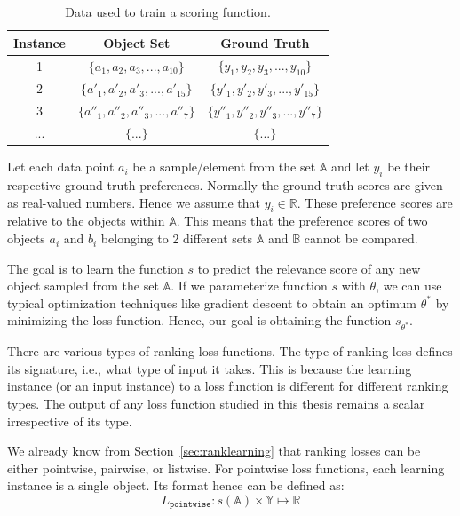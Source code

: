 \documentclass[12pt, twoside, ngerman]{report}
\begin{document}
\begin{table} [ht]
\centering
\begin{tabular}{ | c | c | c | }
  \toprule
  Instance & Object Set & Ground Truth \\ \midrule
  1 & $\{a_1, a_2, a_3, ... , a_{10}\}$  & $\{y_1, y_2, y_3, ... , y_{10}\}$  \\
  2 & $\{a'_1, a'_2, a'_3, ... , a'_{15}\}$ & $\{y'_1, y'_2, y'_3, ... , y'_{15}\}$  \\
  3 & $\{a''_1, a''_2, a''_3, ... , a''_{7}\}$ & $\{y''_1, y''_2, y''_3, ... , y''_{7}\}$  \\
  ... & $\{...\}$ & $\{...\}$ \\
  \bottomrule
\end{tabular}
\caption{Data used to train a scoring function.}
\label {tab:dataformat}
\end{table}

Let each data point $a_i$ be a sample/element from the set $\mathbb{A}$ and let $y_i$ be their respective ground truth preferences.
Normally the ground truth scores are given as real-valued numbers. Hence we assume that $y_i \in \mathbb{R}$.
These preference scores are relative to the objects within $\mathbb{A}$.
This means that the preference scores of two objects $a_i$ and $b_i$ belonging to 2 different sets $\mathbb{A}$ and $\mathbb{B}$ cannot be compared.

The goal is to learn the function $s$ to predict the relevance score of any new object sampled from the set $\mathbb{A}$.
If we parameterize function $s$ with $\theta$, we can use typical optimization techniques like gradient descent to obtain an optimum $\theta^*$ by minimizing the loss function. 
Hence, our goal is obtaining the function $s_{\theta^*}$.

There are various types of ranking loss functions. The type of ranking loss defines its signature, i.e., what type of input it takes.
This is because the learning instance (or an input instance) to a loss function is different for different ranking types.
The output of any loss function studied in this thesis remains a scalar irrespective of its type.

We already know from Section~\ref{sec:ranklearning} that ranking losses can be either pointwise, pairwise, or listwise.
For pointwise loss functions, each learning instance is a single object.
Its format hence can be defined as:
\begin{equation}
L_{\texttt{pointwise}} : s(\mathbb{A}) \times \mathbb{Y} \mapsto \mathbb{R}
\end{equation}
\end{document}
